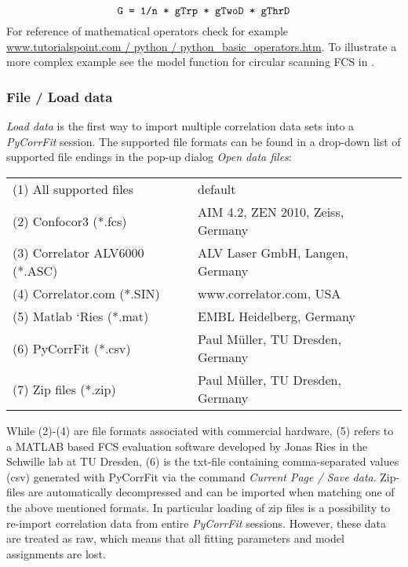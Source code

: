 \begin{equation}
\texttt{G = 1/n * gTrp * gTwoD * gThrD} \notag
\end{equation}
For reference of mathematical operators check for example \href{http://www.tutorialspoint.com/python/python_basic_operators.htm}{www.tutorialspoint.com / python / python\_basic\_operators.htm}. To illustrate a more complex example see the model function for circular scanning FCS in . 

\subsubsection{File / Load data}
\label{sec:menub.filem.loadd}
\textit{Load data }is the first way to import multiple correlation data sets into a \textit{PyCorrFit} session. The supported file formats can be found in a drop-down list of supported file endings in the pop-up dialog \textit{Open data files}:


\begin{tabular}{l l}
 \rule{0pt}{3ex}  (1) All supported files & default \\
 \rule{0pt}{3ex} (2) Confocor3 (*.fcs) & AIM 4.2, ZEN 2010, Zeiss, Germany \\
 \rule{0pt}{3ex} (3) Correlator ALV6000 (*.ASC) & ALV Laser GmbH, Langen, Germany \\
 \rule{0pt}{3ex} (4) Correlator.com (*.SIN) & www.correlator.com, USA \\
 \rule{0pt}{3ex} (5) Matlab ‘Ries (*.mat) & EMBL Heidelberg, Germany \\
 \rule{0pt}{3ex} (6) PyCorrFit (*.csv) & Paul Müller, TU Dresden, Germany \\
 \rule{0pt}{3ex} (7) Zip files (*.zip) & Paul Müller, TU Dresden, Germany \\
\end{tabular}
\vspace{3ex}
\newline
While (2)-(4) are file formats associated with commercial hardware, (5) refers to a MATLAB based FCS evaluation software developed by Jonas Ries in the Schwille lab at TU Dresden, (6) is the txt-file containing comma-separated values (csv) generated with PyCorrFit via the command \textit{Current Page / Save data}. Zip-files are automatically decompressed and can be imported when matching one of the above mentioned formats. In particular loading of zip files is a possibility to re-import correlation data from entire \textit{PyCorrFit} sessions. However, these data are treated as raw, which means that all fitting parameters and model assignments are lost.

